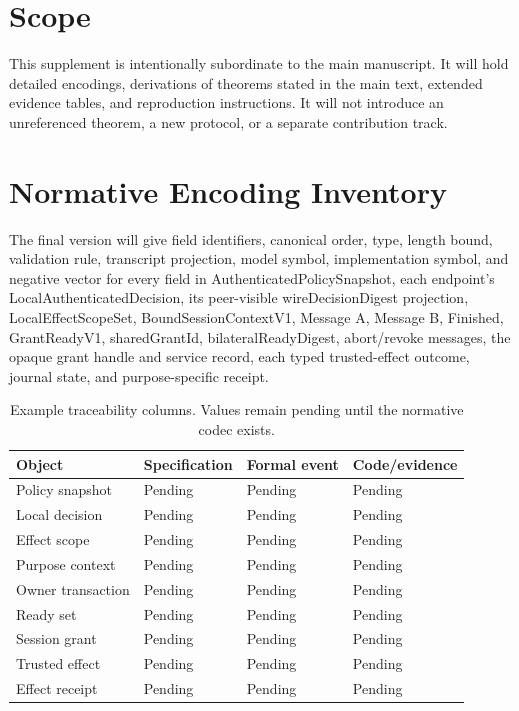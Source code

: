 \documentclass[journal]{IEEEtran}
\begin{document}
\maketitle

\section{Scope}
This supplement is intentionally subordinate to the main manuscript. It will
hold detailed encodings, derivations of theorems stated in the main text,
extended evidence tables, and reproduction instructions. It will not introduce
an unreferenced theorem, a new protocol, or a separate contribution track.

\section{Normative Encoding Inventory}
The final version will give field identifiers, canonical order, type, length
bound, validation rule, transcript projection, model symbol, implementation
symbol, and negative vector for every field in
\textsf{AuthenticatedPolicySnapshot}, each endpoint's
\textsf{LocalAuthenticatedDecision}, its peer-visible
\textsf{wireDecisionDigest} projection,
\textsf{LocalEffectScopeSet},
\textsf{BoundSessionContextV1}, Message A, Message B, Finished,
\textsf{GrantReadyV1}, \textsf{sharedGrantId},
\textsf{bilateralReadyDigest}, abort/revoke messages, the opaque grant handle and
service record, each typed trusted-effect outcome, journal state, and
purpose-specific receipt.

\begin{table}[H]
\caption{Example traceability columns. Values remain pending until the normative codec exists.}
\label{tab:traceability-columns}
\centering
\small
\setlength{\tabcolsep}{2.5pt}
\begin{tabular}{@{}L{0.20\columnwidth}L{0.22\columnwidth}L{0.15\columnwidth}L{0.27\columnwidth}@{}}
\toprule
Object & Specification & Formal event & Code/evidence \\
\midrule
Policy snapshot & Pending & Pending & Pending \\
Local decision & Pending & Pending & Pending \\
Effect scope & Pending & Pending & Pending \\
Purpose context & Pending & Pending & Pending \\
Owner transaction & Pending & Pending & Pending \\
Ready set & Pending & Pending & Pending \\
Session grant & Pending & Pending & Pending \\
Trusted effect & Pending & Pending & Pending \\
Effect receipt & Pending & Pending & Pending \\
\bottomrule
\end{tabular}
\end{table}
\end{document}
